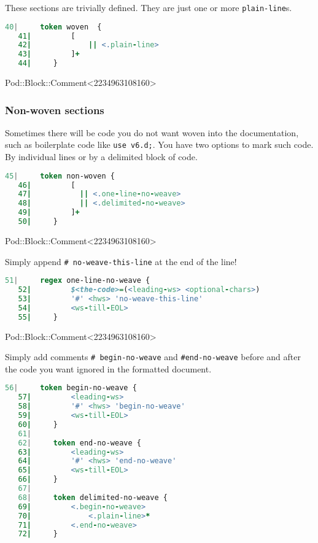 \documentclass{scrartcl}
\begin{document}
These sections are trivially defined. They are just one or more
\texttt{plain-line}s.

\begin{lstlisting}[language=Raku]
   40|     token woven  {
   41|         [
   42|             || <.plain-line>
   43|         ]+
   44|     } 

\end{lstlisting}


Pod::Block::Comment<2234963108160>

\subsubsection{Non-woven sections}

Sometimes there will be code you do not want woven into the documentation,
such as boilerplate code like \texttt{use v6.d;}. You have two options to
mark such code. By individual lines or by a delimited block of code.

\begin{lstlisting}[language=Raku]
   45|     token non-woven {
   46|         [
   47|           || <.one-line-no-weave>
   48|           || <.delimited-no-weave>
   49|         ]+
   50|     } 

\end{lstlisting}


Pod::Block::Comment<2234963108160>

Simply append \texttt{\# no-weave-this-line} at the end of the line!

\begin{lstlisting}[language=Raku]
   51|     regex one-line-no-weave {
   52|         $<the-code>=(<leading-ws> <optional-chars>)
   53|         '#' <hws> 'no-weave-this-line'
   54|         <ws-till-EOL>
   55|     } 

\end{lstlisting}


Pod::Block::Comment<2234963108160>

Simply add comments \texttt{\# begin-no-weave} and \texttt{\#end-no-weave}
before and after the code you want ignored in the formatted document.

\begin{lstlisting}[language=Raku]
   56|     token begin-no-weave {
   57|         <leading-ws>
   58|         '#' <hws> 'begin-no-weave'
   59|         <ws-till-EOL>
   60|     } 
   61| 
   62|     token end-no-weave {
   63|         <leading-ws>
   64|         '#' <hws> 'end-no-weave'
   65|         <ws-till-EOL>
   66|     } 
   67| 
   68|     token delimited-no-weave {
   69|         <.begin-no-weave>
   70|             <.plain-line>*
   71|         <.end-no-weave>
   72|     } 

\end{lstlisting}
\end{document}
